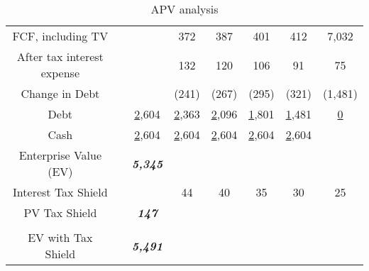 \begin{table}[ht]
\begin{tabular}{@{}cccccccc@{}}
FCF, including TV               &       &                         & 372         & 387         & 401         & 412         & 7,032       \\
After tax interest expense      &       &                         & 132         & 120         & 106         & 91          & 75          \\
Change in Debt                  &       &                         & (241)       & (267)       & (295)       & (321)       & (1,481)     \\
Debt                            &       & {\ul 2,604}             & {\ul 2,363} & {\ul 2,096} & {\ul 1,801} & {\ul 1,481} & {\ul 0}     \\
Cash                            &       & {\ul 2,604}             & {\ul 2,604} & {\ul 2,604} & {\ul 2,604} & {\ul 2,604} & {\ul }      \\
Enterprise Value (EV)           &       & \textit{\textbf{5,345}} &             &             &             &             &             \\
Interest Tax Shield             &       &                         & 44          & 40          & 35          & 30          & 25          \\
PV Tax Shield                   &       & \textit{\textbf{147}}   &             &             &             &             &             \\
                                &       &                         &             &             &             &             &             \\
EV with Tax Shield              &       & \textit{\textbf{5,491}} &             &             &             &             &             \\ \bottomrule
\end{tabular}
\caption{APV analysis}
\label{tab:prob4-apv}
\end{table}
